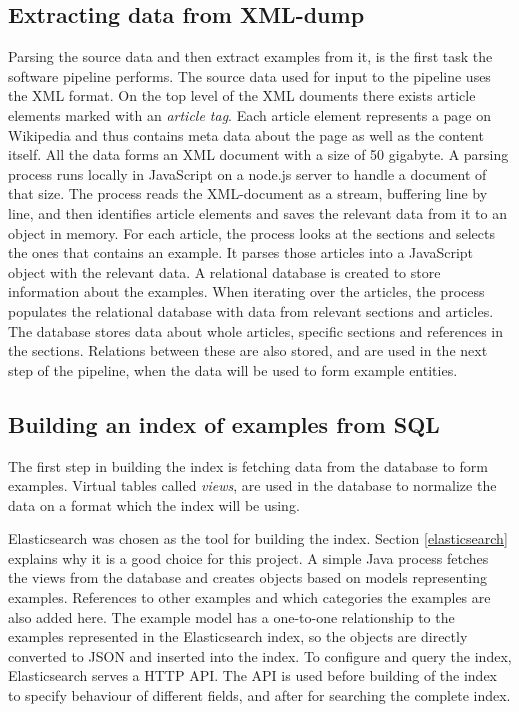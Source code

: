 \subsection{Extracting data from XML-dump}
Parsing the source data and then extract examples from it, is the first task the software pipeline performs. The source data used for input to the pipeline uses the XML format. On the top level of the XML douments there exists article elements marked with an \textit{article tag}. Each article element represents a page on Wikipedia and thus contains meta data about the page as well as the content itself. All the data forms an XML document with a size of 50 gigabyte. A parsing process runs locally in JavaScript on a node.js server to handle a document of that size. The process reads the XML-document as a stream, buffering line by line, and then identifies article elements and saves the relevant data from it to an object in memory. For each article, the process looks at the sections and selects the ones that contains an example. It parses those articles into a JavaScript object with the relevant data. A relational database is created to store information about the examples. When iterating over the articles, the process populates the relational database with data from relevant sections and articles. The database stores data about whole articles, specific sections and references in the sections. Relations between these are also stored, and are used in the next step of the pipeline, when the data will be used to form example entities. 

\subsection{Building an index of examples from SQL}
The first step in building the index is fetching data from the database to form examples. Virtual tables called \textit{views}, are used in the database to normalize the data on a format which the index will be using.

Elasticsearch was chosen as the tool for building the index. Section \ref{elasticsearch} explains why it is a good choice for this project. A simple Java process fetches the views from the database and creates objects based on models representing examples. References to other examples and which categories the examples are also added here. The example model has a one-to-one relationship to the examples represented in the Elasticsearch index, so the objects are directly converted to JSON and inserted into the index. To configure and query the index, Elasticsearch serves a HTTP API. The API is used before building of the index to specify behaviour of different fields, and after for searching the complete index.


